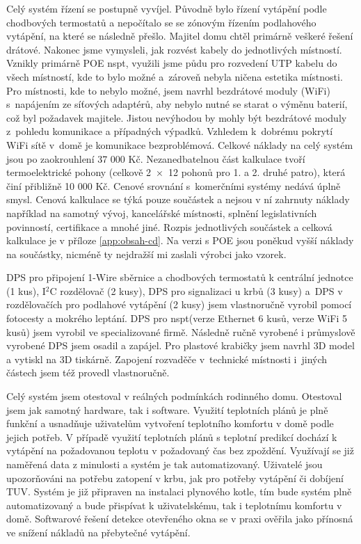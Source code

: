 Celý systém řízení se postupně vyvíjel. Původně bylo řízení vytápění podle chodbových termostatů a nepočítalo se se zónovým řízením podlahového vytápění, na které se následně přešlo. Majitel domu chtěl primárně veškeré řešení drátové. Nakonec jsme vymysleli, jak rozvést kabely do jednotlivých místností. Vznikly primárně POE \acrshort{nspt}, využili jsme půdu pro rozvedení UTP kabelu do všech místností, kde to bylo možné a~zároveň nebyla ničena estetika místnosti. Pro místnosti, kde to nebylo možné, jsem navrhl bezdrátové moduly (WiFi) s~napájením ze síťových adaptérů, aby nebylo nutné se starat o výměnu baterií, což byl požadavek majitele. Jistou nevýhodou by mohly být bezdrátové moduly z~pohledu komunikace a případných výpadků. Vzhledem k~dobrému pokrytí WiFi sítě v~domě je komunikace bezproblémová. Celkové náklady na celý systém jsou po zaokrouhlení 37 000 Kč. Nezanedbatelnou část kalkulace tvoří termoelektrické pohony (celkově 2~×~12 pohonů pro 1. a 2. druhé patro), která činí přibližně 10 000 Kč. Cenové srovnání s~komerčními systémy nedává úplně smysl. Cenová kalkulace se týká pouze součástek a nejsou v ní zahrnuty náklady například na samotný vývoj, kancelářské místnosti, splnění legislativních povinností, certifikace a mnohé jiné. Rozpis jednotlivých součástek a celková kalkulace je v příloze \ref{app:obsah-cd}.  Na verzi s POE jsou poněkud vyšší náklady na součástky, nicméně ty nejdražší mi zaslali výrobci jako vzorek.

DPS pro připojení 1-Wire sběrnice a chodbových termostatů k centrální jednotce (1 kus), I$^{2}$C rozdělovač (2 kusy), DPS pro signalizaci u krbů (3 kusy) a~DPS v rozdělovačích pro podlahové vytápění (2 kusy) jsem vlastnoručně vyrobil pomocí fotocesty a mokrého leptání. DPS pro \acrshort{nspt}(verze Ethernet 6 kusů, verze WiFi 5 kusů) jsem vyrobil ve specializované firmě. Následně ručně vyrobené i průmyslově vyrobené DPS jsem osadil a zapájel. Pro plastové krabičky jsem navrhl 3D model a vytiskl na 3D tiskárně. Zapojení rozvaděče v~technické místnosti i~jiných částech jsem též provedl vlastnoručně.

Celý systém jsem otestoval v reálných podmínkách rodinného domu. Otestoval jsem jak samotný hardware, tak i software. Využití teplotních plánů je plně funkční a usnadňuje uživatelům vytvoření teplotního komfortu v domě podle jejich potřeb. V případě využití teplotních plánů s teplotní predikcí dochází k vytápění na požadovanou teplotu v požadovaný čas bez zpoždění. Využívají se již naměřená data z minulosti a systém je tak automatizovaný. Uživatelé jsou upozorňováni na potřebu zatopení v krbu, jak pro potřeby vytápění či dobíjení TUV. Systém je již připraven na instalaci plynového kotle, tím bude systém plně automatizovaný a bude přispívat k uživatelskému, tak i teplotnímu komfortu v domě. Softwarové řešení detekce otevřeného okna se v praxi ověřila jako přínosná ve snížení nákladů na přebytečné vytápění.

